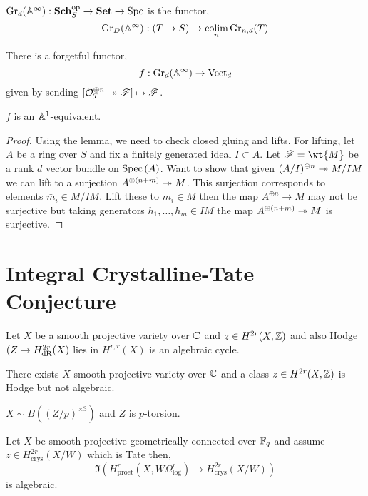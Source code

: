 \documentclass[12pt]{article}
\begin{document}
\begin{defn}
$\mathrm{Gr}_d(\mathbb{A}^\infty) : \mathbf{Sch}_S^{\mathrm{op}} \to \mathbf{Set} \to \mathrm{Spc}$ is the functor,
\[ \mathrm{Gr}_D(\mathbb{A}^\infty) : (T \to S) \mapsto \operatorname*{\mathrm{colim}}_n \mathrm{Gr}_{n,d}(T) \]
\end{defn}

\begin{defn}
There is a forgetful functor,
\[ f : \mathrm{Gr}_d(\mathbb{A}^{\infty}) \to \mathrm{Vect}_d \]
given by sending $[\mathcal{O}_{T}^{\oplus n} \twoheadrightarrow \mathscr{F}] \mapsto \mathscr{F}$.
\end{defn}

\begin{prop}
$f$ is an $\mathbb{A}^1$-equivalent.
\end{prop}

\begin{proof}
Using the lemma, we need to check closed gluing and lifts. For lifting, let $A$ be a ring over $S$ and fix a finitely generated ideal $I \subset A$. Let $\F = \wt{M}$ be a rank $d$ vector bundle on $\mathrm{Spec}\left( A \right)$. Want to show that given $(A/I)^{\oplus n} \twoheadrightarrow M/IM$ we can lift to a surjection $A^{\oplus (n+m)} \twoheadrightarrow M$. This surjection corresponds to elements $\bar{m}_i \in M / I M$. Lift these to $m_i \in M$ then the map $A^{\oplus n} \to M$ may not be surjective but taking generators $h_1, \dots, h_m \in IM$ the map $A^{\oplus (n + m)} \twoheadrightarrow M$ is surjective.
\end{proof}

\section{Integral Crystalline-Tate Conjecture}

\begin{conj}[Tate]
Let $X$ be a smooth projective variety over $\mathbb{C}$ and $z \in H^{2r}(X, \mathbb{Z})$ and also Hodge $(Z \to H^{2r}_{\mathrm{dR}}(X)$ lies in $H^{r,r}(X)$ is an algebraic cycle.
\end{conj}

\begin{theorem}
There exists $X$ smooth projective variety over $\mathbb{C}$  and a class $z \in H^{2r}(X, \mathbb{Z})$ is Hodge but not algebraic.
\end{theorem}

\begin{example}
$X \sim B((Z / p)^{\times 3})$ and $Z$ is $p$-torsion.
\end{example}

\begin{conj}
Let $X$ be smooth projective geometrically connected over $\mathbb{F}_q$ and assume $z \in H^{2r}_{\text{crys}}(X/W)$ which is Tate then,
\[ \Im{(H^r_{\text{proet}}(X, W \Omega^r_{\log}) \to H^{2r}_{\text{crys}}(X/W))} \]
is algebraic.
\end{conj}
\end{document}
